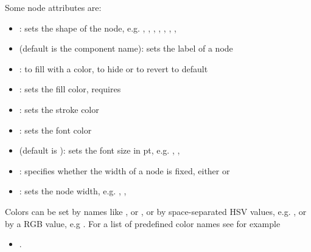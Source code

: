 \documentclass[letterpaper,10pt,english]{sphinxmanual}
\begin{document}
Some node attributes are:
\begin{itemize}
\item {} 
: sets the shape of the node, e.g. , , , , , , , 

\item {} 
 (default is the component name): sets the label of a node

\item {} 
:  to fill with a color,  to hide or  to revert to default

\item {} 
: sets the fill color, requires 

\item {} 
: sets the stroke color

\item {} 
: sets the font color

\item {} 
 (default is ): sets the font size in pt, e.g. , , 

\item {} 
: specifies whether the width of a node is fixed, either  or 

\item {} 
: sets the node width, e.g. , , 

\end{itemize}

Colors can be set by names like ,  or ,
or by space-separated HSV values, e.g. ,
or by a RGB value, e.g .
For a list of predefined color names see for example
\begin{itemize}
\item {} 
.

\end{itemize}
\end{document}
